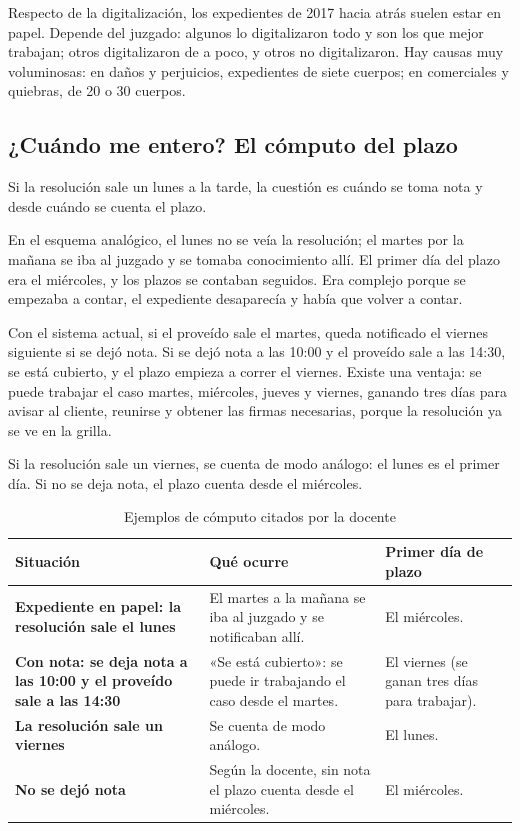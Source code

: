 \documentclass[12pt,oneside]{book}
\begin{document}
Respecto de la digitalización, los expedientes de 2017 hacia atrás suelen estar en papel. Depende del juzgado: algunos lo digitalizaron todo y son los que mejor trabajan; otros digitalizaron de a poco, y otros no digitalizaron. Hay causas muy voluminosas: en daños y perjuicios, expedientes de siete cuerpos; en comerciales y quiebras, de 20 o 30 cuerpos.

\subsection{¿Cuándo me entero? El cómputo del plazo}

Si la resolución sale un lunes a la tarde, la cuestión es cuándo se toma nota y desde cuándo se cuenta el plazo.

En el esquema analógico, el lunes no se veía la resolución; el martes por la mañana se iba al juzgado y se tomaba conocimiento allí. El primer día del plazo era el miércoles, y los plazos se contaban seguidos. Era complejo porque se empezaba a contar, el expediente desaparecía y había que volver a contar.

Con el sistema actual, si el proveído sale el martes, queda notificado el viernes siguiente si se dejó nota. Si se dejó nota a las 10:00 y el proveído sale a las 14:30, se está cubierto, y el plazo empieza a correr el viernes. Existe una ventaja: se puede trabajar el caso martes, miércoles, jueves y viernes, ganando tres días para avisar al cliente, reunirse y obtener las firmas necesarias, porque la resolución ya se ve en la grilla.

Si la resolución sale un viernes, se cuenta de modo análogo: el lunes es el primer día. Si no se deja nota, el plazo cuenta desde el miércoles.

\begin{table}[H]
\centering
\caption{Ejemplos de cómputo citados por la docente}
\begin{tabularx}{\textwidth}{L{0.28\textwidth} Y L{0.18\textwidth}}
\toprule
\textbf{Situación} & \textbf{Qué ocurre} & \textbf{Primer día de plazo} \\
\midrule
\textbf{Expediente en papel: la resolución sale el lunes} & El martes a la mañana se iba al juzgado y se notificaban allí. & El miércoles. \\
\addlinespace
\textbf{Con nota: se deja nota a las 10:00 y el proveído sale a las 14:30} & «Se está cubierto»: se puede ir trabajando el caso desde el martes. & El viernes (se ganan tres días para trabajar). \\
\addlinespace
\textbf{La resolución sale un viernes} & Se cuenta de modo análogo. & El lunes. \\
\addlinespace
\textbf{No se dejó nota} & Según la docente, sin nota el plazo cuenta desde el miércoles. & El miércoles. \\
\bottomrule
\end{tabularx}
\end{table}
\end{document}
